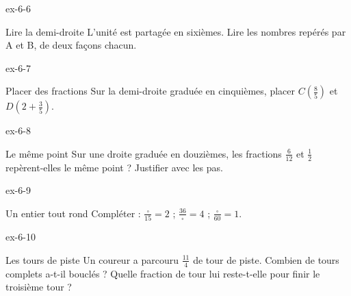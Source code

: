 \begin{blocLivre}{ex-6-6}\begin{exercice}[2]{Lire la demi-droite}
L’unité est partagée en sixièmes. Lire les nombres repérés par A et B, de deux façons chacun.
\label{fig-ex-6-6}
\end{exercice}\end{blocLivre}
\begin{blocLivre}{ex-6-7}\begin{exercice}[2]{Placer des fractions}
Sur la demi-droite graduée en cinquièmes, placer $C\left(\frac85\right)$ et $D\left(2+\frac35\right)$.
\label{fig-ex-6-7}
\end{exercice}\end{blocLivre}
\begin{blocLivre}{ex-6-8}\begin{exercice}[2]{Le même point}
Sur une droite graduée en douzièmes, les fractions $\frac6{12}$ et $\frac12$ repèrent-elles le même point ? Justifier avec les pas.
\label{fig-ex-6-8}
\end{exercice}\end{blocLivre}
\begin{blocLivre}{ex-6-9}\begin{exercice}[2]{Un entier tout rond}
Compléter : $\frac{\square}{15}=2$ ; $\frac{36}{\square}=4$ ; $\frac{\square}{60}=1$.
\end{exercice}\end{blocLivre}
\begin{blocLivre}{ex-6-10}\begin{exercice}[2]{Les tours de piste}
Un coureur a parcouru $\frac{11}4$ de tour de piste. Combien de tours complets a-t-il bouclés ? Quelle fraction de tour lui reste-t-elle pour finir le troisième tour ?
\end{exercice}\end{blocLivre}

